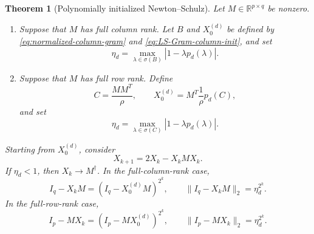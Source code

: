 \documentclass[12pt,a4paper]{article}
\theoremstyle{plain}
\newtheorem{theorem}{Theorem}[section]
\theoremstyle{definition}
\theoremstyle{remark}
\begin{document}
\begin{theorem}[Polynomially initialized Newton--Schulz]
\label{thm:polynomial-NS}
Let $M\in\mathbb{R}^{p\times q}$ be nonzero.

\begin{enumerate}[label=\textup{(\roman*)}]
\item Suppose that $M$ has full column rank.  Let $B$ and $X_0^{(d)}$ be defined by \eqref{eq:normalized-column-gram} and \eqref{eq:LS-Gram-column-init}, and set
\begin{equation} \label{eq:column-polynomial-error}
    \eta_d = \max_{\lambda\in\sigma(B)} \left|1-\lambda p_d(\lambda)\right|.
\end{equation}

\item Suppose that $M$ has full row rank.  Define
\begin{equation} \label{eq:normalized-row-gram}
    C=\frac{MM^T}{\rho}, \qquad X_0^{(d)} = M^T\frac{1}{\rho}p_d(C),
\end{equation}
and set
\begin{equation} \label{eq:row-polynomial-error}
    \eta_d = \max_{\lambda\in\sigma(C)} \left|1-\lambda p_d(\lambda)\right|.
\end{equation}
\end{enumerate}

Starting from $X_0^{(d)}$, consider
\begin{equation}\label{eq:polynomial-NS-iteration}
    X_{k+1}=2X_k-X_kMX_k.
\end{equation}
If $\eta_d<1$, then $X_k\to M^\dagger$.  In the full-column-rank case,
\begin{equation} \label{eq:column-polynomial-residual-rate}
    I_q-X_kM = \left(I_q-X_0^{(d)}M\right)^{2^k}, \qquad \|I_q-X_kM\|_2=\eta_d^{2^k}.
\end{equation}
In the full-row-rank case,
\begin{equation}
\label{eq:row-polynomial-residual-rate}
I_p-MX_k
=
\left(I_p-MX_0^{(d)}\right)^{2^k},
\qquad
\|I_p-MX_k\|_2=\eta_d^{2^k}.
\end{equation}
\end{theorem}
\end{document}
